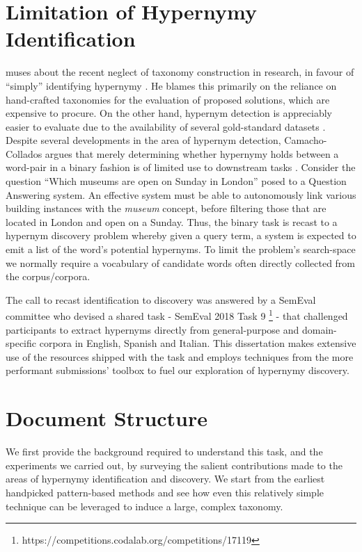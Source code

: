 \section{Limitation of Hypernymy Identification}
\citeauthor{camacho2017we} muses about the recent neglect of taxonomy construction in research, in favour of “simply” identifying hypernymy \citep{camacho2017we}.  He blames this primarily on the reliance on hand-crafted taxonomies for the evaluation of proposed solutions, which are expensive to procure.  On the other hand, hypernym detection is appreciably easier to evaluate due to the availability of several gold-standard datasets \citep{Baroni2011, santus2015evalution, weeds2014learning}.  Despite several developments in the area of hypernym detection, Camacho-Collados argues that merely determining whether hypernymy holds between a word-pair in a binary fashion is of limited use to downstream tasks \citep{camacho2017we}.  Consider the question “Which museums are open on Sunday in London” posed to a Question Answering system.  An effective system must be able to autonomously link various building instances with the \textit{museum} concept, before filtering those that are located in London and open on a Sunday.  Thus, the binary task is recast to a hypernym discovery problem whereby given a query term, a system is expected to emit a list of the word’s potential hypernyms.  To limit the problem’s search-space we normally require a vocabulary of candidate words often directly collected from the corpus/corpora.

The call to recast identification to discovery was answered by a SemEval committee who devised a shared task - SemEval 2018 Task 9 \footnote{https://competitions.codalab.org/competitions/17119} - that challenged participants to extract hypernyms directly from general-purpose and domain-specific corpora in English, Spanish and Italian.  This dissertation makes extensive use of the resources shipped with the task and employs techniques from the more performant submissions’ toolbox to fuel our exploration of hypernymy discovery. 

\section{Document Structure}
We first provide the background required to understand this task, and the experiments we carried out, by surveying the salient contributions made to the areas of hypernymy identification and discovery.   We start from the earliest handpicked pattern-based methods and see how even this relatively simple technique can be leveraged to induce a large, complex taxonomy.  

